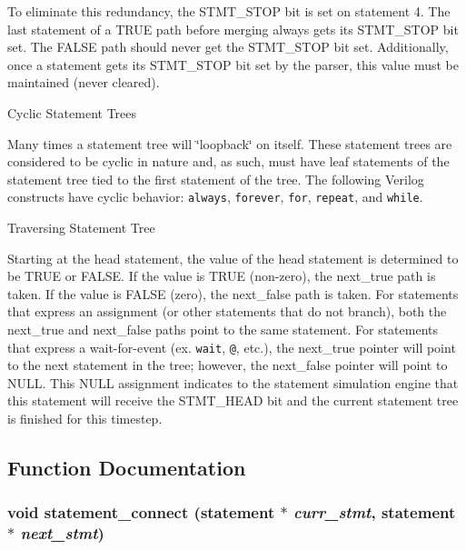  To eliminate this redundancy, the STMT\_\-STOP bit is set on statement 4. The last statement of a TRUE path before merging always gets its STMT\_\-STOP bit set. The FALSE path should never get the STMT\_\-STOP bit set. Additionally, once a statement gets its STMT\_\-STOP bit set by the parser, this value must be maintained (never cleared).\begin{Desc}
\item[Cyclic Statement Trees]\par
 Many times a statement tree will \char`\"{}loopback\char`\"{} on itself. These statement trees are considered to be cyclic in nature and, as such, must have leaf statements of the statement tree tied to the first statement of the tree. The following Verilog constructs have cyclic behavior: {\tt always}, {\tt forever}, {\tt for}, {\tt repeat}, and {\tt while}.\end{Desc}
\begin{Desc}
\item[Traversing Statement Tree]\par
 Starting at the head statement, the value of the head statement is determined to be TRUE or FALSE. If the value is TRUE (non-zero), the next\_\-true path is taken. If the value is FALSE (zero), the next\_\-false path is taken. For statements that express an assignment (or other statements that do not branch), both the next\_\-true and next\_\-false paths point to the same statement. For statements that express a wait-for-event (ex. {\tt wait}, {\tt @}, etc.), the next\_\-true pointer will point to the next statement in the tree; however, the next\_\-false pointer will point to NULL. This NULL assignment indicates to the statement simulation engine that this statement will receive the STMT\_\-HEAD bit and the current statement tree is finished for this timestep.\end{Desc}


\subsection{Function Documentation}
\subsubsection{\setlength{\rightskip}{0pt plus 5cm}void statement\_\-connect ({\bf statement} $\ast$ {\em curr\_\-stmt}, {\bf statement} $\ast$ {\em next\_\-stmt})}\label{statement_8c_a7}


